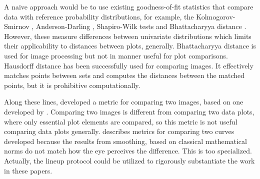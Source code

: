 \documentclass[12pt]{article}\usepackage[]{graphicx}\usepackage[]{color}
\begin{document}
A naive approach would be to use existing goodness-of-fit statistics that compare data with reference probability distributions, for example, the Kolmogorov-Smirnov \citep{stephens:1974}, Anderson-Darling \citep{stephens:1974}, Shapiro-Wilk \citep{shapiro:1965} tests and Bhattacharyya distance \citep{bhattacharyya:1946}. However, these measure differences between univariate distributions which limits their applicability to distances between plots, generally. Bhattacharyya distance is used for image processing but not in manner useful for plot comparisons.
Hausdorff distance \citep{huttenlocher:1993} has been successfully used for comparing images. It effectively matches points between sets and computes the distances between the matched points, but it is prohibitive computationally. 

Along these lines, \citet{hannig:2013} developed a metric for comparing two images, based on one developed by \citet{Baddeley:1992}. Comparing two images is different from comparing two data plots, where only essential plot elements are compared, so this metric is not useful comparing data plots generally. \citet{marron:1995} describes metrics for comparing two curves developed because the results from smoothing, based on classical mathematical norms do not match how the eye perceives the difference. This is too specialized. Actually, the lineup protocol could be utilized to rigorously substantiate the work in these papers. 
\end{document}
